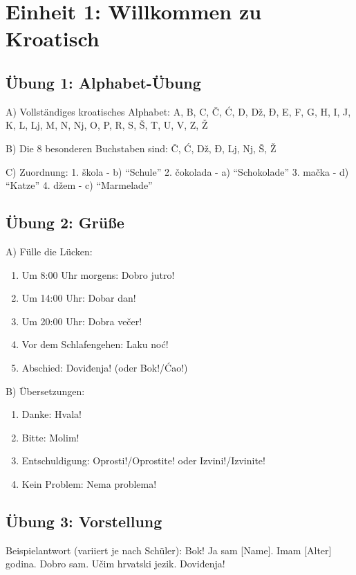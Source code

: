 
\section{Einheit 1: Willkommen zu Kroatisch}

\subsection*{Übung 1: Alphabet-Übung}

A) Vollständiges kroatisches Alphabet:
A, B, C, Č, Ć, D, Dž, Đ, E, F, G, H, I, J, K, L, Lj, M, N, Nj, O, P, R, S, Š, T, U, V, Z, Ž

B) Die 8 besonderen Buchstaben sind: Č, Ć, Dž, Đ, Lj, Nj, Š, Ž

C) Zuordnung:
1. škola - b) ``Schule''
2. čokolada - a) ``Schokolade''
3. mačka - d) ``Katze''
4. džem - c) ``Marmelade''

\subsection*{Übung 2: Grüße}

A) Fülle die Lücken:
\begin{enumerate}
    \item Um 8:00 Uhr morgens: Dobro jutro!
    \item Um 14:00 Uhr: Dobar dan!
    \item Um 20:00 Uhr: Dobra večer!
    \item Vor dem Schlafengehen: Laku noć!
    \item Abschied: Doviđenja! (oder Bok!/Ćao!)
\end{enumerate}

B) Übersetzungen:
\begin{enumerate}
    \item Danke: Hvala!
    \item Bitte: Molim!
    \item Entschuldigung: Oprosti!/Oprostite! oder Izvini!/Izvinite!
    \item Kein Problem: Nema problema!
\end{enumerate}

\subsection*{Übung 3: Vorstellung}

Beispielantwort (variiert je nach Schüler):
Bok! Ja sam [Name]. Imam [Alter] godina. Dobro sam. Učim hrvatski jezik. Doviđenja!


